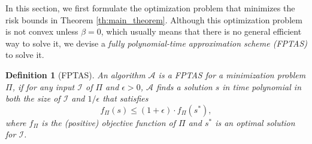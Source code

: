 \documentclass[letterpaper]{article} %
\newtheorem{definition}{Definition}
\newcommand{\red}[1]{\textcolor{red}{#1}}
\newcommand{\todo}[1]{\red{\textsc{todo:} #1}}
\begin{document}
In this section, we first formulate the optimization problem that minimizes the risk bounds in Theorem \ref{th:main_theorem}. 
Although this optimization problem is not convex unless $\beta=0$, which usually means that there is no general efficient way to solve it, we devise a \emph{fully polynomial-time approximation scheme (FPTAS)} to solve it.
\begin{definition}[FPTAS]
  An algorithm $\mathcal{A}$ is a FPTAS for a minimization problem $\Pi$, if for any input $\mathcal{I}$ of $\Pi$ and $\epsilon>0$, $\mathcal{A}$ finds a solution $s$ in time polynomial in both the size of $\mathcal{I}$ and $1/\epsilon$ that satisfies
  \[f_\Pi(s)\le (1+\epsilon) \cdot f_\Pi(s^*),\]
  where $f_\Pi$ is the (positive) objective function of $\Pi$ and $s^*$ is an optimal solution for $\mathcal{I}$.
\end{definition}
\end{document}
